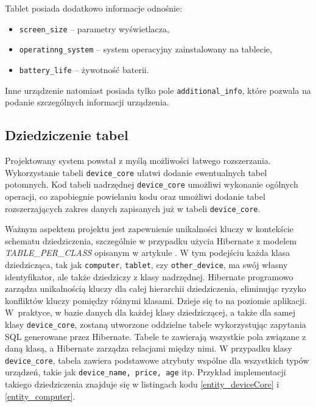 Tablet posiada dodatkowo informacje odnośnie:
\begin{itemize}
	\item \texttt{screen\_size} -- parametry wyświetlacza,
	\item \texttt{operatinng\_system} -- system operacyjny zainstalowany na tablecie,
	\item \texttt{battery\_life} -- żywotność baterii.
\end{itemize}
Inne urządzenie natomiast posiada tylko pole \texttt{additional\_info}, które pozwala na podanie szczególnych informacji urządzenia.

\subsection{Dziedziczenie tabel}
\label{dzedziczenie_hibernate:label}
Projektowany system powstał z myślą możliwości łatwego rozszerzania. Wykorzystanie tabeli \texttt{device\_core} ułatwi dodanie ewentualnych tabel potomnych. Kod tabeli nadrzędnej \texttt{device\_core} umożliwi wykonanie ogólnych operacji, co zapobiegnie powielaniu kodu oraz umożliwi dodanie tabel rozszerzających zakres danych zapisanych już w tabeli \texttt{device\_core}. 

Ważnym aspektem projektu jest zapewnienie unikalności kluczy w kontekście schematu dziedziczenia, szczególnie w przypadku użycia Hibernate z modelem \emph{TABLE\_PER\_CLASS} opisanym w artykule \cite{hibernateMapping}. W tym podejściu każda klasa dziedzicząca, tak jak \texttt{computer}, \texttt{tablet}, czy \texttt{other\_device}, ma swój własny identyfikator, ale także dziedziczy z klasy nadrzędnej. Hibernate programowo zarządza unikalnością kluczy dla całej hierarchii dziedziczenia, eliminując ryzyko konfliktów kluczy pomiędzy różnymi klasami. Dzieje się to na poziomie aplikacji. W~praktyce, w bazie danych dla każdej klasy dziedziczącej, a także dla samej klasy \texttt{device\_core}, zostaną utworzone oddzielne tabele wykorzystując zapytania SQL generowane przez Hibernate. Tabele te zawierają wszystkie pola związane z daną klasą, a Hibernate zarządza relacjami między nimi. W przypadku klasy \texttt{device\_core}, tabela zawiera podstawowe atrybuty wspólne dla wszystkich typów urządzeń, takie jak \texttt{device\_name, price, age} itp. Przykład implementacji takiego dziedziczenia znajduje się w listingach kodu \ref{entity_deviceCore} i \ref{entity_computer}.


